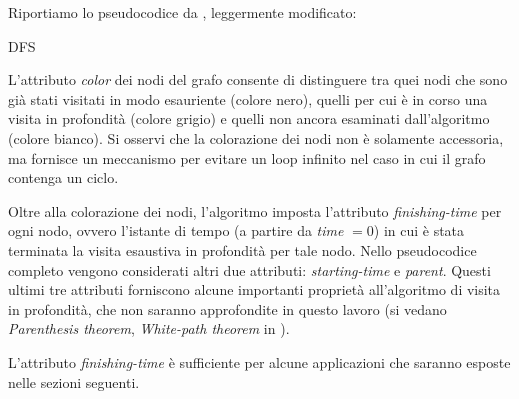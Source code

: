 Riportiamo lo pseudocodice da \cite{clrs}, leggermente modificato:\\
\begin{algorithm}[H]
    \label{alg:dfs}
    \caption{DFS}
    \SetAlgoLined
\end{algorithm}
L'attributo \emph{color} dei nodi del grafo consente di distinguere tra quei nodi che sono già stati visitati in modo esauriente (colore nero), quelli per cui è in corso una visita in profondità (colore grigio) e quelli non ancora esaminati dall'algoritmo (colore bianco). Si osservi che la colorazione dei nodi non è solamente accessoria, ma fornisce un meccanismo per evitare un loop infinito nel caso in cui il grafo contenga un ciclo.

Oltre alla colorazione dei nodi, l'algoritmo imposta l'attributo \emph{finishing-time} per ogni nodo, ovvero l'istante di tempo (a partire da \emph{time} $= 0$) in cui è stata terminata la visita esaustiva in profondità per tale nodo. Nello pseudocodice completo vengono considerati altri due attributi: \emph{starting-time} e \emph{parent}. Questi ultimi tre attributi forniscono alcune importanti proprietà all'algoritmo di visita in profondità, che non saranno approfondite in questo lavoro (si vedano \emph{Parenthesis theorem}, \emph{White-path theorem} in \cite{clrs}).

L'attributo \emph{finishing-time} è sufficiente per alcune applicazioni che saranno esposte nelle sezioni seguenti.
